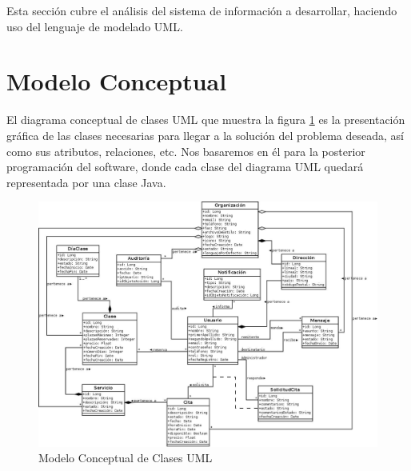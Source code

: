 


Esta sección cubre el análisis del sistema de información a desarrollar, haciendo uso del lenguaje de modelado UML.

\section{Modelo Conceptual}

El diagrama conceptual de clases UML que muestra la figura \ref{fig:modelo-conceptual} es la presentación gráfica de las clases necesarias para llegar a la solución del problema deseada, así como sus atributos, relaciones, etc. Nos basaremos en él para la posterior programación del software, donde cada clase del diagrama UML quedará representada por una clase Java. 

\vspace{15mm}

\begin{figure}[h!]
\centering
  \includegraphics[scale=.35]{img/modelo-conceptual.jpeg}
  \caption{Modelo Conceptual de Clases UML}
  \label{fig:modelo-conceptual}
\end{figure}


